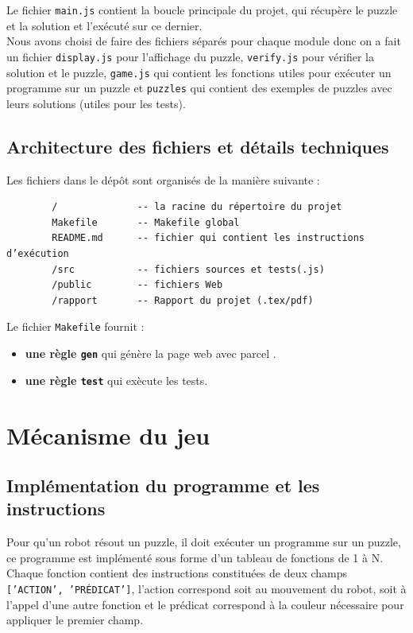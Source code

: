 \documentclass[11pt]{article}
\begin{document}
Le fichier \texttt{main.js} contient la boucle principale du projet, qui récupère le puzzle et la solution et l'exécuté sur ce dernier.\\
Nous avons choisi de faire des fichiers séparés pour chaque module donc on a fait un fichier \texttt{display.js} pour l'affichage du puzzle, \texttt{verify.js}  pour vérifier la solution et le puzzle, \texttt{game.js} qui contient les fonctions utiles pour exécuter un programme sur un puzzle et \texttt{puzzles} qui contient des exemples de puzzles avec leurs solutions (utiles pour les tests).\\ 

\subsection{Architecture des fichiers et détails techniques}
Les fichiers dans le dépôt sont organisés de la manière suivante :\\
\begin{center}
    
    \begin{verbatim}
        /              -- la racine du répertoire du projet
        Makefile       -- Makefile global
        README.md      -- fichier qui contient les instructions d’exécution
        /src           -- fichiers sources et tests(.js)
        /public        -- fichiers Web
        /rapport       -- Rapport du projet (.tex/pdf)
    \end{verbatim}
        
\end{center}

Le fichier \texttt{Makefile} fournit :
\begin{itemize}
    \item \textbf{une règle \texttt{gen}} qui génère la page web avec parcel .
    \item \textbf{une règle \texttt{test}} qui exècute les tests.
\end{itemize}

\section{Mécanisme du jeu}
\subsection{Implémentation du programme et les instructions }
Pour qu'un robot résout un puzzle, il doit exécuter un programme sur un puzzle, ce programme est implémenté sous forme d'un tableau de fonctions de 1 à N. Chaque fonction contient des instructions constituées de deux champs \texttt{['ACTION', 'PRÉDICAT']}, l'action correspond soit au mouvement du robot, soit \`a l'appel d'une autre fonction et le prédicat correspond à la couleur nécessaire pour appliquer le premier champ.\\
\end{document}

